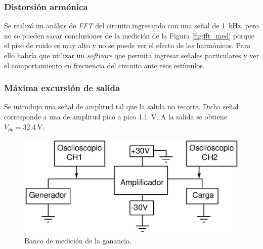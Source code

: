 		\subsubsection{Distorsión armónica}
		
			Se realizó un análsis de \emph{FFT} del circuito ingresando con una señal de \SI{1}{\kHz}, pero no se pueden sacar conclusiones de la medición de la Figura \ref{fig:fft_med} porque el piso de ruido es muy alto y no se puede ver el efecto de los harmónicos. Para ello habría que utilizar un \emph{software} que permita ingresar señales particulares y ver el comportamiento en frecuencia del circuito ante esos estímulos.


		\subsubsection{Máxima excursión de salida}
			
		Se introdujo una señal de amplitud tal que la salida no recorte. Dicha señal corresponde a una de amplitud pico a pico \SI{1.1}{\V}. A la salida se obtiene $V_{pp} = \SI{32.4}{\V}$.

		\begin{figure}[h!]
			\centering
			\includegraphics[scale=0.6]{./Figuras/bco_ganancia.eps}
			\caption{Banco de medición de la ganancia.}
			\label{fig:bco_ganancia}
		\end{figure}



